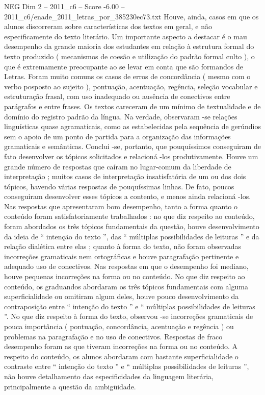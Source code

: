 \begin{textsample}{NEG Dim 2 – 2011\_c6 – Score -6.00 – 2011\_c6/enade\_2011\_letras\_por\_385230ec73.txt}
Houve, ainda, casos em que os alunos discorreram sobre características dos textos em geral, e não especificamente do texto literário.
Um importante aspecto a destacar é o mau desempenho da grande maioria dos estudantes em relação à estrutura formal do texto produzido ( mecanismos de coesão e utilização do padrão formal culto ), o que é extremamente preocupante ao se levar em conta que são formandos de Letras.
Foram muito comuns os casos de erros de concordância ( mesmo com o verbo posposto ao sujeito ), pontuação, acentuação, regência, seleção vocabular e estruturação frasal, com uso inadequado ou ausência de conectivos entre parágrafos e entre frases.
Os textos careceram de um mínimo de textualidade e de domínio do registro padrão da língua.
Na verdade, observaram -se relações linguísticas quase agramaticais, como as estabelecidas pela sequência de gerúndios sem o apoio de um ponto de partida para a organização das informações gramaticais e semânticas.
Conclui -se, portanto, que pouquíssimos conseguiram de fato desenvolver os tópicos solicitados e relacioná -los produtivamente.
Houve um grande número de respostas que caíram no lugar-comum da liberdade de interpretação ; muitos casos de interpretação insatisfatória de um ou dos dois tópicos, havendo várias respostas de pouquíssimas linhas.
De fato, poucos conseguiram desenvolver esses tópicos a contento, e menos ainda relacioná -los.
Nas respostas que apresentaram bom desempenho, tanto a forma quanto o conteúdo foram satisfatoriamente trabalhados : no que diz respeito ao conteúdo, foram abordados os três tópicos fundamentais da questão, houve desenvolvimento da ideia de “ intenção do texto ”, das “ múltiplas possibilidades de leituras ” e da relação dialética entre elas ; quanto à forma do texto, não foram observadas incorreções gramaticais nem ortográficas e houve paragrafação pertinente e adequado uso de conectivos.
Nas respostas em que o desempenho foi mediano, houve pequenas incorreções na forma ou no conteúdo.
No que diz respeito ao conteúdo, os graduandos abordaram os três tópicos fundamentais com alguma superficialidade ou omitiram algum deles, houve pouco desenvolvimento da contraposição entre “ intenção do texto ” e “ múltiplas possibilidades de leituras ”.
No que diz respeito à forma do texto, observou -se incorreções gramaticais de pouca importância ( pontuação, concordância, acentuação e regência ) ou problemas na paragrafação e no uso de conectivos.
Respostas de fraco desempenho foram as que tiveram incorreções na forma ou no conteúdo.
A respeito do conteúdo, os alunos abordaram com bastante superficialidade o contraste entre “ intenção do texto ” e “ múltiplas possibilidades de leituras ”, não houve detalhamento das especificidades da linguagem literária, principalmente a questão da ambigüidade.

\end{textsample}
